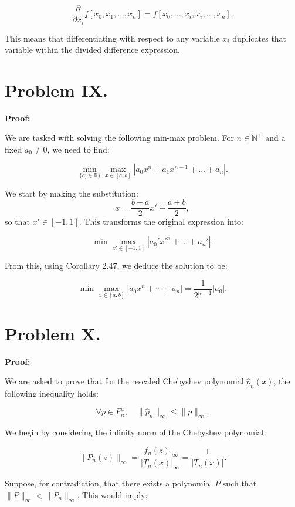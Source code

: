 \documentclass[a4paper, 12pt]{article}
\renewcommand{\qed}{\hfill \boxed{\mathbb{Q.E.D.}}}
\begin{document}
\[
\frac{\partial}{\partial x_i} f[x_0, x_1, \dots, x_n] = f[x_0, \dots, x_i, x_i, \dots, x_n].
\]

This means that differentiating with respect to any variable \(x_i\) duplicates that variable within the divided difference expression.

\qed

\section*{Problem IX.}

\textbf{Proof:}

We are tasked with solving the following min-max problem. For \( n \in \mathbb{N}^+ \) and a fixed \( a_0 \neq 0 \), we need to find:

\[
\min_{\{a_i \in \mathbb{R}\}} \max_{x \in [a, b]} \left| a_0 x^n + a_1 x^{n-1} + \dots + a_n \right|.
\]

We start by making the substitution:
\[
x = \dfrac{b-a}{2} x' + \dfrac{a+b}{2},
\]
so that \( x' \in [-1, 1] \). This transforms the original expression into:

\[
\min \max_{x' \in [-1, 1]} \left| a_0' {x'}^n + \dots + a_n' \right|.
\]

From this, using Corollary 2.47, we deduce the solution to be:

\[
\min \max_{x \in [a, b]} \left| a_0 x^n + \cdots + a_n \right| = \dfrac{1}{2^{n-1}} |a_0|.
\]

\qed

\section*{Problem X.}

\textbf{Proof:}

We are asked to prove that for the rescaled Chebyshev polynomial \( \hat{p}_n(x) \), the following inequality holds:

\[
\forall p \in P^a_n, \quad \|\hat{p}_n\|_\infty \leq \|p\|_\infty.
\]

We begin by considering the infinity norm of the Chebyshev polynomial:

\[
\| P_n(z) \|_\infty = \frac{| f_n(z) |_\infty}{| T_n(x) |_\infty} = \frac{1}{| T_n(x) |}.
\]

Suppose, for contradiction, that there exists a polynomial \( P \) such that \( \|P\|_\infty < \|P_n\|_\infty \). This would imply:
\end{document}
